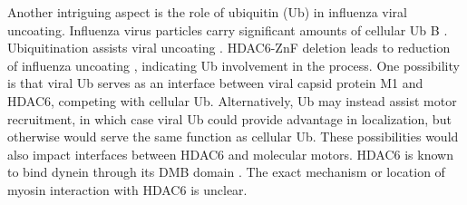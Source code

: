 Another intriguing aspect is the role of ubiquitin (Ub) in influenza viral uncoating. Influenza virus particles carry significant amounts of cellular Ub B \cite{hutchinson2014conserved}. Ubiquitination assists viral uncoating \cite{rudnicka2016ubiquitin}. HDAC6-ZnF deletion leads to reduction of influenza uncoating \cite{banerjee2014influenza}, indicating Ub involvement in the process. One possibility is that viral Ub serves as an interface between viral capsid protein M1 and HDAC6, competing with cellular Ub. Alternatively, Ub may instead assist motor recruitment, in which case viral Ub could provide advantage in localization, but otherwise would serve the same function as cellular Ub. These possibilities would also impact interfaces between HDAC6 and molecular motors. HDAC6 is known to bind dynein through its DMB domain \cite{kawaguchi2003deacetylase}. The exact mechanism or location of myosin interaction with HDAC6 is unclear.
